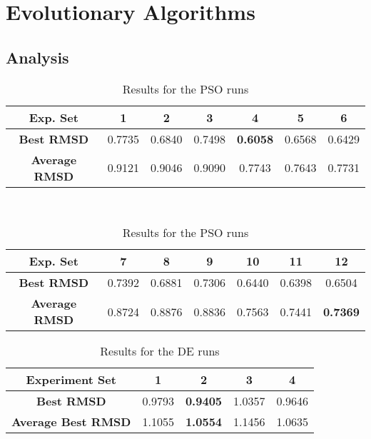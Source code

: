 \section{Evolutionary Algorithms}

\subsection{Analysis}

\begin{table}
	\centering
	\begin{tabular}{ | >{\bfseries}c | c | c | c | c | c | c | }
		\hline
		Exp. Set & 1 & 2 & 3 & 4 & 5 & 6 \\ \hline
		Best RMSD & 0.7735 & 0.6840 & 0.7498 & \textbf{0.6058} & 0.6568 & 0.6429 \\ \hline
		Average RMSD & 0.9121 & 0.9046 & 0.9090 & 0.7743 & 0.7643 & 0.7731 \\ \hline
	\end{tabular}
	\\
	\vspace{3 mm}
	\begin{tabular}{ | >{\bfseries}c | c | c | c | c | c | c | }
		\hline
		Exp. Set & 7 & 8 & 9 & 10 & 11 & 12 \\ \hline
		Best RMSD & 0.7392 & 0.6881 & 0.7306 & 0.6440 & 0.6398 & 0.6504 \\ \hline
		Average RMSD & 0.8724 & 0.8876 & 0.8836 & 0.7563 & 0.7441 & \textbf{0.7369} \\ \hline
	\end{tabular}
	\caption{Results for the PSO runs}
	\label{table:ea-pso-results}
\end{table}

\begin{table}
	\centering
	\begin{tabular}{ | >{\bfseries}c | c | c | c | c | }
		\hline
		Experiment Set & 1 & 2 & 3 & 4 \\ \hline
		Best RMSD & 0.9793 & \textbf{0.9405} & 1.0357 & 0.9646 \\ \hline
		Average Best RMSD & 1.1055 & \textbf{1.0554} & 1.1456 & 1.0635 \\ \hline
	\end{tabular}
	\caption{Results for the DE runs}
	\label{table:ea-de-results}
\end{table}